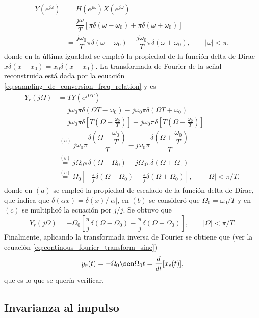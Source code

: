 \documentclass[a4paper]{report}
\begin{document}
\begin{align*}
 Y(e^{j\omega})&=H(e^{j\omega})X(e^{j\omega})\\
  &=\dfrac{j\omega}{T}\left[\pi\delta(\omega-\omega_0)+\pi\delta(\omega+\omega_0)\right]\\
  &=\dfrac{j\omega_0}{T}\pi\delta(\omega-\omega_0)-\dfrac{j\omega_0}{T}\pi\delta(\omega+\omega_0),
  \qquad |\omega|<\pi,
\end{align*}
donde en la última igualdad se empleó la propiedad de la función delta de Dirac \(x\delta(x-x_0)=x_0\delta(x-x_0)\). La transformada de Fourier de la señal reconstruida está dada por la ecuación \ref{eq:sampling_dc_conversion_freq_relation} y es
\begin{align*}
 Y_r(j\Omega)&=TY(e^{j\Omega T})\\
  &=j\omega_0\pi\delta(\Omega T-\omega_0)-j\omega_0\pi\delta(\Omega T+\omega_0)\\
  &=j\omega_0\pi\delta\left[T\left(\Omega-\frac{\omega_0}{T}\right)\right]-j\omega_0\pi\delta\left[T\left(\Omega+\frac{\omega_0}{T}\right)\right]\\
  &\overset{(a)}{=}j\omega_0\pi\dfrac{\delta\left(\Omega-\dfrac{\omega_0}{T}\right)}{T}-j\omega_0\pi\dfrac{\delta\left(\Omega+\dfrac{\omega_0}{T}\right)}{T}\\
  &\overset{(b)}{=}j\Omega_0\pi\delta(\Omega-\Omega_0)-j\Omega_0\pi\delta(\Omega+\Omega_0)\\
  &\overset{(c)}{=}\Omega_0\left[-\frac{\pi}{j}\delta(\Omega-\Omega_0)+\frac{\pi}{j}\delta(\Omega+\Omega_0)\right],
  \qquad|\Omega|<\pi/T,
\end{align*}
donde en \((a)\) se empleó la propiedad de escalado de la función delta de Dirac, que indica que \(\delta(\alpha x)=\delta(x)/|\alpha|\), en \((b)\) se consideró que \(\Omega_0=\omega_0/T\) y en \((c)\) se multiplicó la ecuación por \(j/j\). Se obtuvo que
\[
 Y_r(j\Omega)=-\Omega_0\left[\frac{\pi}{j}\delta(\Omega-\Omega_0)-\frac{\pi}{j}\delta(\Omega+\Omega_0)\right],
 \qquad|\Omega|<\pi/T.
\]
Finalmente, aplicando la transformada inversa de Fourier se obtiene que (ver la ecuación \ref{eq:continous_fourier_transform_sine})
\[
 y_r(t)=-\Omega_0\sen\Omega_0t=\frac{d}{dt}[x_c(t)],
\]
que es lo que se quería verificar.

\subsection{Invarianza al impulso}\label{sec:sampling_impulse_invariance}
\end{document}
